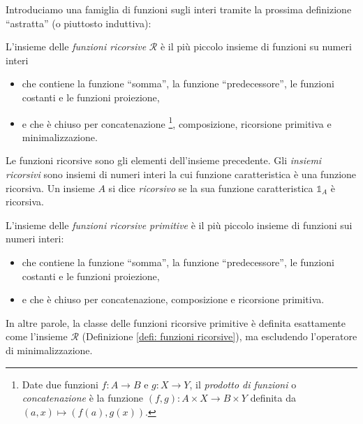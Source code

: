 Introduciamo una famiglia di funzioni sugli interi tramite la prossima definizione ``astratta'' (o piuttosto induttiva):

\begin{defi}\label{defi: funzioni ricorsive}
L'insieme delle \emph{funzioni ricorsive} $\mathcal R$ è il più piccolo insieme di funzioni su numeri interi
\begin{itemize}
    \item che contiene la funzione ``somma'', la funzione ``predecessore'', le funzioni costanti e le funzioni proiezione,
    \item e che è chiuso per concatenazione
    \footnote{Date due funzioni $f\colon A \to B$ e $g\colon X \to Y$, il
    \emph{prodotto di funzioni} o \emph{concatenazione} è la funzione
    $(f, g)\colon A \times X \to B \times Y$
    definita da $(a,x) \mapsto (f(a), g(x))$.},
    composizione, ricorsione primitiva e minimalizzazione.
\end{itemize}
Le funzioni ricorsive sono gli elementi dell'insieme precedente. Gli \emph{insiemi ricorsivi} sono insiemi di numeri interi la cui funzione caratteristica è una funzione ricorsiva.
Un insieme $A$ si dice \textit{ricorsivo}
se la sua funzione caratteristica $\mathbb 1_A$ è ricorsiva.
\end{defi}

\begin{defi}\label{defi: funzioni ricorsive primitive}
L'insieme delle \emph{funzioni ricorsive primitive} è il più piccolo insieme di funzioni sui numeri interi:
\begin{itemize}
    \item che contiene la funzione ``somma'', la funzione ``predecessore'', le funzioni costanti e le funzioni proiezione,
    \item e che è chiuso per concatenazione, composizione e ricorsione primitiva.
\end{itemize}
In altre parole, la classe delle funzioni ricorsive primitive è definita esattamente come l'insieme $\mathcal R$ (Definizione \ref{defi: funzioni ricorsive}), ma escludendo l'operatore di minimalizzazione.
\end{defi}

